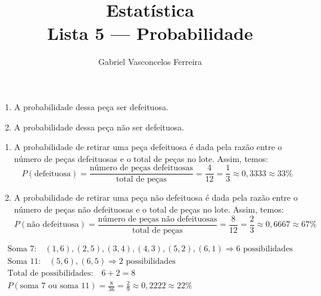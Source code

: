 \documentclass{jhwhw}
\begin{document}
\author{Gabriel Vasconcelos Ferreira}
\title{%
	Estatística\\Lista 5 --- Probabilidade
}
\maketitle
{}
\begin{enumerate}[label=\alph*)]
	\item A probabilidade dessa peça ser defeituosa.
	\item A probabilidade dessa peça não ser defeituosa.
\end{enumerate}
\begin{enumerate}[label=\alph*)]
	\item A probabilidade de retirar uma peça defeituosa é dada pela razão entre o número de peças defeituosas e o total de peças no lote. Assim, temos:
	      \begin{equation*}
		      P(\text{defeituosa}) = \frac{\text{número de peças defeituosas}}{\text{total de peças}} = \frac{4}{12} = \frac{1}{3} \approx 0,3333 \approx \boxed{33\%}
	      \end{equation*}
	\item A probabilidade de retirar uma peça não defeituosa é dada pela razão entre o número de peças não defeituosas e o total de peças no lote. Assim, temos:
	      \begin{equation*}
		      P(\text{não defeituosa}) = \frac{\text{número de peças não defeituosas}}{\text{total de peças}} = \frac{8}{12} = \frac{2}{3} \approx 0,6667 \approx \boxed{67\%}
	      \end{equation*}
\end{enumerate}
\begin{gather*}
	\text{Soma 7:} \quad (1,6), (2,5), (3,4), (4,3), (5,2), (6,1) \Rightarrow 6 \text{ possibilidades}\\
	\text{Soma 11:} \quad (5,6), (6,5) \Rightarrow 2 \text{ possibilidades}\\
	\text{Total de possibilidades:} \quad 6 + 2 = 8\\
	P(\text{soma 7 ou soma 11}) = \frac{8}{36} = \frac{2}{9} \approx 0,2222 \approx \boxed{22\%}
\end{gather*}
\end{document}
